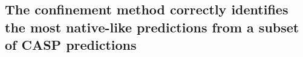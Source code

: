 \documentclass[12pt]{article}
\newcommand{\Alberto}[1]{\color{ForestGreen}#1\normalcolor }
\begin{document}


\subsection{The confinement method correctly identifies the most native-like predictions from a
subset of CASP predictions}

\end{document}
